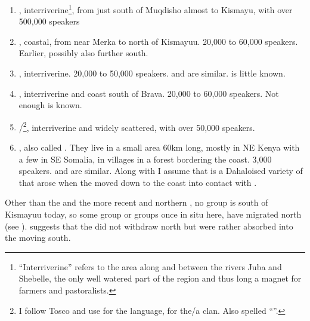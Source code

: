 \documentclass[output=paper,newtxmath,modfonts,nonflat,hidelinks]{langsci/langscibook}
\begin{document}
\begin{enumerate}
\item  {}, interriverine\footnote{“Interriverine” refers to the area along and between the rivers Juba and Shebelle, the only well watered part of the region and thus long a magnet for farmers and pastoralists.}, from just south of Muqdisho almost to Kismayu, with over 500,000 speakers

\item {}, coastal, from near Merka to north of Kismayuu. 20,000 to 60,000 speakers. Earlier, possibly also further south. 

\item {}, interriverine. 20,000 to 50,000 speakers.  and  are similar.  is little known. 

\item {}, interriverine and coast south of Brava. 20,000 to 60,000 speakers. Not enough is known.

\item {}/\footnote{I follow Tosco and use  for the language,  for the/a clan. Also spelled “”.}, interriverine and widely scattered, with over 50,000 speakers.

\item {}, also called . They live in a small area 60km long, mostly in NE Kenya with a few in SE Somalia, in villages in a forest bordering the coast. 3,000 speakers.  and  are similar. Along with \citet{Tosco1994} I assume that  is a Dahaloised variety of  that arose when the  moved down to the coast into contact with .

\end{enumerate}

Other than the  and the more recent  and northern , no   group is south of Kismayuu today, so some group or groups once in situ here, have migrated north (see ). \citet{Ali1985} suggests that the  did not withdraw north but were rather absorbed into the  moving south. 
\end{document}
